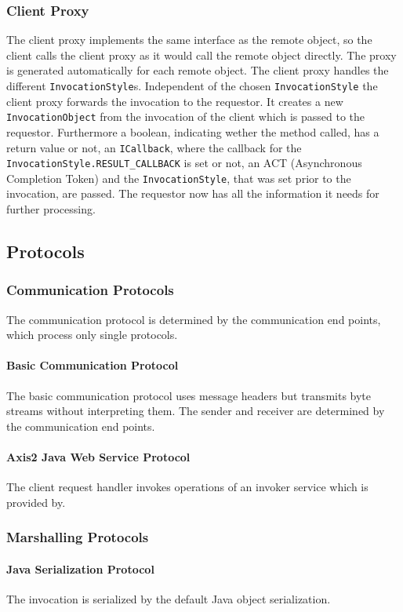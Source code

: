 \subsubsection{Client Proxy}

The client proxy implements the same interface as the remote object, so the client calls the client proxy as it would call the remote object directly. The proxy is generated automatically for each remote object. The client proxy handles the different \texttt{InvocationStyle}s. Independent of the chosen \texttt{InvocationStyle} the client proxy forwards the invocation to the requestor. It creates a new \texttt{InvocationObject} from the invocation of the client which is passed to the requestor. Furthermore a boolean, indicating wether the method called, has a return value or not, an \texttt{ICallback}, where the callback for the \texttt{InvocationStyle.RESULT\_CALLBACK} is set or not, an ACT (Asynchronous Completion Token) and the \texttt{InvocationStyle}, that was set prior to the invocation, are passed. The requestor now has all the information it needs for further processing.

\subsection{Protocols}

\subsubsection{Communication Protocols}

The communication protocol is determined by the communication end points, which process only single protocols.

\paragraph{Basic Communication Protocol}

The basic communication protocol uses message headers but transmits byte streams without interpreting them.
The sender and receiver are determined by the communication end points.

\paragraph{Axis2 Java Web Service Protocol}

The client request handler invokes operations of an invoker service which is provided by.

\subsubsection{Marshalling Protocols}

\paragraph{Java Serialization Protocol}

The invocation is serialized by the default Java object serialization.
